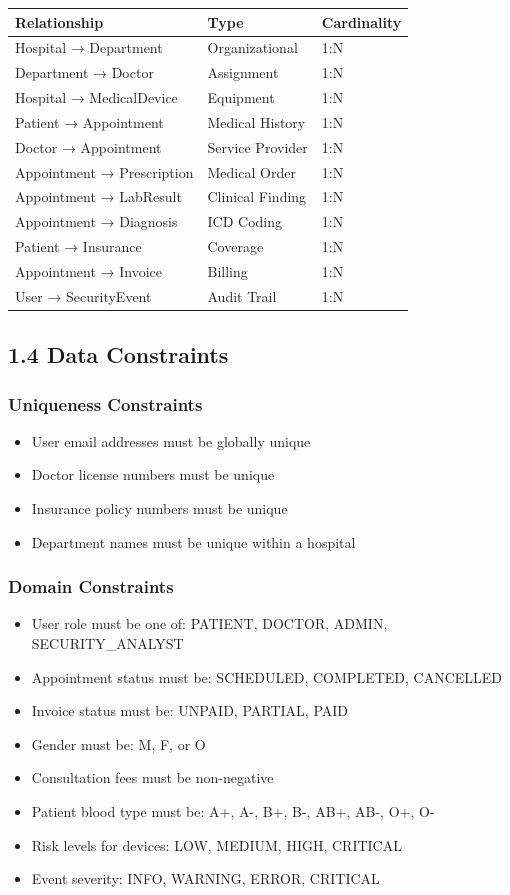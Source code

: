 \begin{tabular}{lll}
\textbf{Relationship} & \textbf{Type} & \textbf{Cardinality} \\
\hline
Hospital → Department & Organizational & 1:N \\
Department → Doctor & Assignment & 1:N \\
Hospital → MedicalDevice & Equipment & 1:N \\
Patient → Appointment & Medical History & 1:N \\
Doctor → Appointment & Service Provider & 1:N \\
Appointment → Prescription & Medical Order & 1:N \\
Appointment → LabResult & Clinical Finding & 1:N \\
Appointment → Diagnosis & ICD Coding & 1:N \\
Patient → Insurance & Coverage & 1:N \\
Appointment → Invoice & Billing & 1:N \\
User → SecurityEvent & Audit Trail & 1:N \\
\end{tabular}

\subsection*{1.4 Data Constraints}

\subsubsection*{Uniqueness Constraints}
\begin{itemize}
    \item User email addresses must be globally unique
    \item Doctor license numbers must be unique
    \item Insurance policy numbers must be unique
    \item Department names must be unique within a hospital
\end{itemize}

\subsubsection*{Domain Constraints}
\begin{itemize}
    \item User role must be one of: PATIENT, DOCTOR, ADMIN, SECURITY\_ANALYST
    \item Appointment status must be: SCHEDULED, COMPLETED, CANCELLED
    \item Invoice status must be: UNPAID, PARTIAL, PAID
    \item Gender must be: M, F, or O
    \item Consultation fees must be non-negative
    \item Patient blood type must be: A+, A-, B+, B-, AB+, AB-, O+, O-
    \item Risk levels for devices: LOW, MEDIUM, HIGH, CRITICAL
    \item Event severity: INFO, WARNING, ERROR, CRITICAL
\end{itemize}

